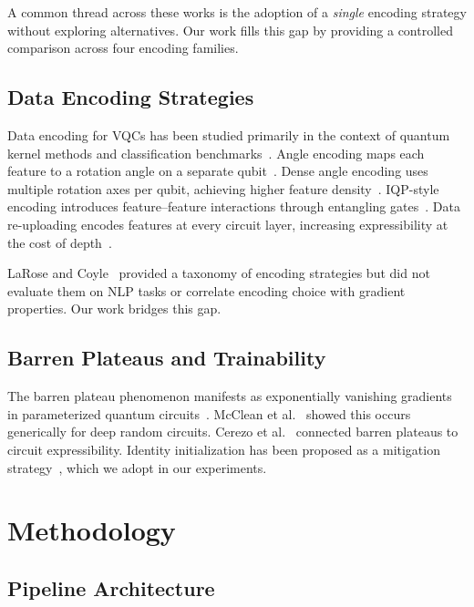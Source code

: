 \documentclass[conference,onecolumn,11pt]{IEEEtran}
\begin{document}
A common thread across these works is the adoption of a \emph{single} encoding strategy without exploring alternatives. Our work fills this gap by providing a controlled comparison across four encoding families.

\subsection{Data Encoding Strategies}

Data encoding for VQCs has been studied primarily in the context of quantum kernel methods and classification benchmarks~\cite{schuld2021encoding,havlicek2019}. Angle encoding maps each feature to a rotation angle on a separate qubit~\cite{mitarai2018}. Dense angle encoding uses multiple rotation axes per qubit, achieving higher feature density~\cite{larose2020}. IQP-style encoding introduces feature--feature interactions through entangling gates~\cite{shepherd2009}. Data re-uploading encodes features at every circuit layer, increasing expressibility at the cost of depth~\cite{perez2020}.

LaRose and Coyle~\cite{larose2020} provided a taxonomy of encoding strategies but did not evaluate them on NLP tasks or correlate encoding choice with gradient properties. Our work bridges this gap.

\subsection{Barren Plateaus and Trainability}

The barren plateau phenomenon manifests as exponentially vanishing gradients in parameterized quantum circuits~\cite{mcclean2018barren}. McClean et al.~\cite{mcclean2018barren} showed this occurs generically for deep random circuits. Cerezo et al.~\cite{cerezo2021cost} connected barren plateaus to circuit expressibility. Identity initialization has been proposed as a mitigation strategy~\cite{mele2024}, which we adopt in our experiments.

\section{Methodology}

\subsection{Pipeline Architecture}
\end{document}
